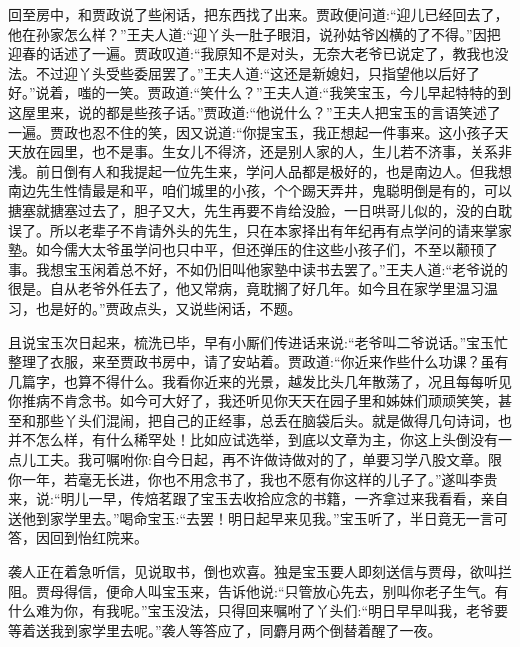 \begin{parag}
\end{parag}


\begin{parag}
    回至房中，和贾政说了些闲话，把东西找了出来。贾政便问道:“迎儿已经回去了，他在孙家怎么样？”王夫人道:“迎丫头一肚子眼泪，说孙姑爷凶横的了不得。”因把迎春的话述了一遍。贾政叹道:“我原知不是对头，无奈大老爷已说定了，教我也没法。不过迎丫头受些委屈罢了。”王夫人道:“这还是新媳妇，只指望他以后好了好。”说着，嗤的一笑。贾政道:“笑什么？”王夫人道:“我笑宝玉，今儿早起特特的到这屋里来，说的都是些孩子话。”贾政道:“他说什么？”王夫人把宝玉的言语笑述了一遍。贾政也忍不住的笑，因又说道:“你提宝玉，我正想起一件事来。这小孩子天天放在园里，也不是事。生女儿不得济，还是别人家的人，生儿若不济事，关系非浅。前日倒有人和我提起一位先生来，学问人品都是极好的，也是南边人。但我想南边先生性情最是和平，咱们城里的小孩，个个踢天弄井，鬼聪明倒是有的，可以搪塞就搪塞过去了，胆子又大，先生再要不肯给没脸，一日哄哥儿似的，没的白耽误了。所以老辈子不肯请外头的先生，只在本家择出有年纪再有点学问的请来掌家塾。如今儒大太爷虽学问也只中平，但还弹压的住这些小孩子们，不至以颟顸了事。我想宝玉闲着总不好，不如仍旧叫他家塾中读书去罢了。”王夫人道:“老爷说的很是。自从老爷外任去了，他又常病，竟耽搁了好几年。如今且在家学里温习温习，也是好的。”贾政点头，又说些闲话，不题。
\end{parag}


\begin{parag}
    且说宝玉次日起来，梳洗已毕，早有小厮们传进话来说:“老爷叫二爷说话。”宝玉忙整理了衣服，来至贾政书房中，请了安站着。贾政道:“你近来作些什么功课？虽有几篇字，也算不得什么。我看你近来的光景，越发比头几年散荡了，况且每每听见你推病不肯念书。如今可大好了，我还听见你天天在园子里和姊妹们顽顽笑笑，甚至和那些丫头们混闹，把自己的正经事，总丢在脑袋后头。就是做得几句诗词，也并不怎么样，有什么稀罕处！比如应试选举，到底以文章为主，你这上头倒没有一点儿工夫。我可嘱咐你:自今日起，再不许做诗做对的了，单要习学八股文章。限你一年，若毫无长进，你也不用念书了，我也不愿有你这样的儿子了。”遂叫李贵来，说:“明儿一早，传焙茗跟了宝玉去收拾应念的书籍，一齐拿过来我看看，亲自送他到家学里去。”喝命宝玉:“去罢！明日起早来见我。”宝玉听了，半日竟无一言可答，因回到怡红院来。
\end{parag}


\begin{parag}
    袭人正在着急听信，见说取书，倒也欢喜。独是宝玉要人即刻送信与贾母，欲叫拦阻。贾母得信，便命人叫宝玉来，告诉他说:“只管放心先去，别叫你老子生气。有什么难为你，有我呢。”宝玉没法，只得回来嘱咐了丫头们:“明日早早叫我，老爷要等着送我到家学里去呢。”袭人等答应了，同麝月两个倒替着醒了一夜。
\end{parag}


